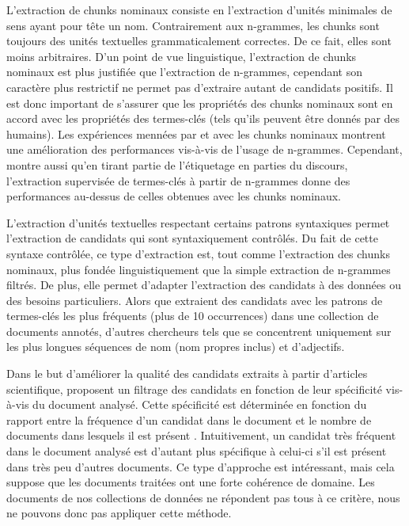     L'extraction de chunks nominaux consiste en l'extraction d'unités
    minimales de sens ayant pour tête un nom. Contrairement aux n-grammes, les
    chunks sont toujours des unités textuelles grammaticalement correctes. De
    ce fait, elles sont moins arbitraires. D'un point de vue linguistique,
    l'extraction de chunks nominaux est plus justifiée que l'extraction de
    n-grammes, cependant son caractère plus restrictif ne permet pas
    d'extraire autant de candidats positifs. Il est donc important de
    s'assurer que les propriétés des chunks nominaux sont en accord avec les
    propriétés des termes-clés (tels qu'ils peuvent être donnés par des
    humains). Les expériences mennées par 
    et  avec les chunks nominaux montrent une
    amélioration des performances vis-à-vis de l'usage de n-grammes.
    Cependant,  montre aussi qu'en tirant
    partie de l'étiquetage en parties du discours, l'extraction supervisée de
    termes-clés à partir de n-grammes donne des performances au-dessus de celles
    obtenues avec les chunks nominaux.

    L'extraction d'unités textuelles respectant certains patrons syntaxiques
    permet l'extraction de candidats qui sont syntaxiquement
    contrôlés. Du fait de cette syntaxe contrôlée, ce type d'extraction est,
    tout comme l'extraction des chunks nominaux, plus fondée linguistiquement
    que la simple extraction de n-grammes filtrés. De plus, elle permet
    d'adapter l'extraction des candidats à des données ou des besoins
    particuliers. Alors que  extraient des
    candidats avec les patrons de termes-clés les plus fréquents (plus de 10
    occurrences) dans une collection de documents annotés, d'autres chercheurs
    tels que  se concentrent uniquement sur les plus
    longues séquences de nom (nom propres inclus) et d'adjectifs.

    Dans le but d'améliorer la qualité des candidats extraits à partir
    d'articles scientifique,  proposent un
    filtrage des candidats en fonction de leur spécificité vis-à-vis du document
    analysé. Cette spécificité est déterminée en fonction du rapport entre la
    fréquence d'un candidat dans le document et le nombre de documents dans
    lesquels il est présent \cite[TF-IDF]{jones1972tfidf}. Intuitivement, un
    candidat très fréquent dans le document analysé est d'autant plus spécifique
    à celui-ci s'il est présent dans très peu d'autres documents. Ce type
    d'approche est intéressant, mais cela suppose que les documents traitées ont
    une forte cohérence de domaine. Les documents de nos collections de données
    ne répondent pas tous à ce critère, nous ne pouvons donc pas appliquer cette
    méthode.

